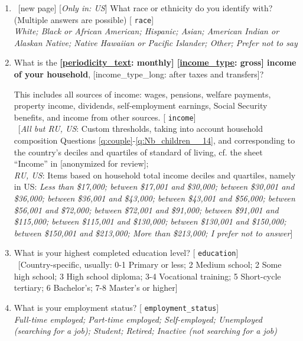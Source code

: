 \begin{enumerate}[resume]
\item ~[new page] \label{q:race} [\textit{Only in: US}] What race or ethnicity do you identify with? (Multiple answers are possible) [%
\verb|race|]
  \\ \textit{White; Black or African American; Hispanic; Asian; American Indian or Alaskan Native; Native Hawaiian or Pacific Islander; Other; Prefer not to say}

\item  \label{q:income} What is the \textbf{[\hyperlink{tab_features}{periodicity\_text}: monthly] [\hyperlink{tab_features}{income\_type}: gross] income of your household}, [income\_type\_long: after taxes and transfers]?

This includes all sources of income: wages, pensions, welfare payments, property income, dividends, self-employment earnings, Social Security benefits, and income from other sources. [%
\verb|income|]
  \\ ~[\textit{All but RU, US}: Custom thresholds, taking into account household composition Questions \ref{q:couple}-\ref{q:Nb_children__14}, and corresponding to the country's deciles and quartiles of standard of living, cf. the sheet ``Income'' in [anonymized for review]; %
  \\ \textit{RU, US}: Items based on household total income deciles and quartiles, namely in US: \textit{Less than \$17,000; between \$17,001 and \$30,000; between \$30,001 and \$36,000; between \$36,001 and \$43,000; between \$43,001 and \$56,000; between \$56,001 and \$72,000; between \$72,001 and \$91,000; between \$91,001 and \$115,000; between \$115,001 and \$130,000; between \$130,001 and \$150,000; between \$150,001 and \$213,000; More than \$213,000; I prefer not to answer}]  %

\item  \label{q:education} What is your highest completed education level? [%
\verb|education|]
  \\ ~[Country-specific, usually: 0-1 Primary or less; 2 Medium school; 2 Some high school; 3 High school diploma; 3-4 Vocational training; 5 Short-cycle tertiary; 6 Bachelor's; 7-8 Master's or higher]

\item  \label{q:employment_status} What is your employment status? [%
\verb|employment_status|]
  \\ \textit{Full-time employed; Part-time employed; Self-employed; Unemployed (searching for a job); Student; Retired; Inactive (not searching for a job)}


\end{enumerate}
